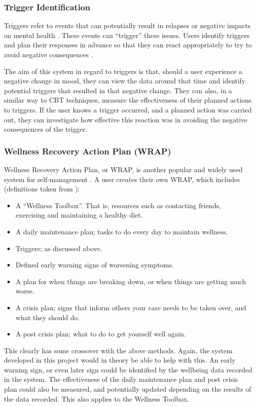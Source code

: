 \documentclass[11pt,openright,a4paper]{report}
\begin{document}
\subsubsection{Trigger Identification}
Triggers refer to events that can potentially result in relapses or negative impacts on mental health \parencite{samhsatriggers}. These events can \enquote{trigger} these issues. Users identify triggers and plan their responses in advance so that they can react appropriately to try to avoid negative consequences \parencite{samhsatriggers}.

The aim of this system in regard to triggers is that, should a user experience a negative change in mood, they can view the data around that time and identify potential triggers that resulted in that negative change. They can also, in a similar way to CBT techniques, measure the effectiveness of their planned actions to triggers. If the user knows a trigger occurred, and a planned action was carried out, they can investigate how effective this reaction was in avoiding the negative consequences of the trigger.

\subsubsection{Wellness Recovery Action Plan (WRAP)}
Wellness Recovery Action Plan, or WRAP, is another popular and widely used system for self-management \parencite{mhrwrap}. A user creates their own WRAP, which includes (definitions taken from \parencite{mhrwrap}):
\begin{itemize}
\item A \enquote{Wellness Toolbox}. That is, resources such as contacting friends, exercising and maintaining a healthy diet.
\item A daily maintenance plan; tasks to do every day to maintain wellness.
\item Triggers; as discussed above.
\item Defined early warning signs of worsening symptoms.
\item A plan for when things are breaking down, or when things are getting much worse.
\item A crisis plan; signs that inform others your care needs to be taken over, and what they should do.
\item A post crisis plan; what to do to get yourself well again.
\end{itemize}

This clearly has some crossover with the above methods. Again, the system developed in this project would in theory be able to help with this. An early warning sign, or even later sign could be identified by the wellbeing data recorded in the system. The effectiveness of the daily maintenance plan and post crisis plan could also be measured, and potentially updated depending on the results of the data recorded. This also applies to the Wellness Toolbox.
\end{document}
